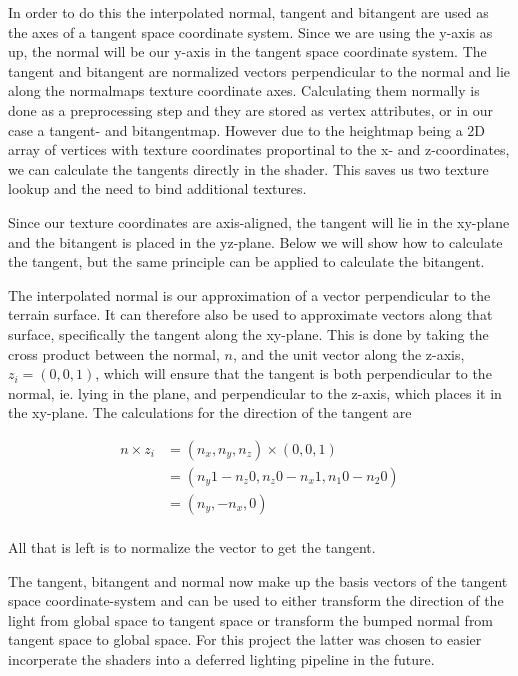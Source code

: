 In order to do this the interpolated normal, tangent and bitangent are
used as the axes of a tangent space coordinate system. Since we are
using the y-axis as up, the normal will be our y-axis in the tangent
space coordinate system. The tangent and bitangent are normalized
vectors perpendicular to the normal and lie along the normalmaps
texture coordinate axes. Calculating them normally is done as a
preprocessing step and they are stored as vertex attributes, or in our
case a tangent- and bitangentmap. However due to the heightmap being a
2D array of vertices with texture coordinates proportinal to the x-
and z-coordinates, we can calculate the tangents directly in the
shader. This saves us two texture lookup and the need to bind
additional textures.

Since our texture coordinates are axis-aligned, the tangent will lie
in the xy-plane and the bitangent is placed in the yz-plane. Below we
will show how to calculate the tangent, but the same principle can be
applied to calculate the bitangent.

The interpolated normal is our approximation of a vector perpendicular
to the terrain surface. It can therefore also be used to approximate
vectors along that surface, specifically the tangent along the
xy-plane. This is done by taking the cross product between the normal,
$n$, and the unit vector along the z-axis, $z_i = (0,0,1)$, which will
ensure that the tangent is both perpendicular to the normal, ie.
lying in the plane, and perpendicular to the z-axis, which places it
in the xy-plane. The calculations for the direction of the tangent are

\begin{displaymath}
  \begin{array}{rl}
  n \times z_i &= (n_x, n_y, n_z) \times (0,0,1)\\
  &= (n_y 1 - n_z 0, n_z 0 - n_x 1, n_1 0 - n_2 0) \\
  &= (n_y, - n_x, 0) \\
  \end{array}
\end{displaymath}

All that is left is to normalize the vector to get the tangent.

The tangent, bitangent and normal now make up the basis vectors of the
tangent space coordinate-system and can be used to either transform
the direction of the light from global space to tangent space or
transform the bumped normal from tangent space to global space. For
this project the latter was chosen to easier incorperate the shaders
into a deferred lighting pipeline in the future.

